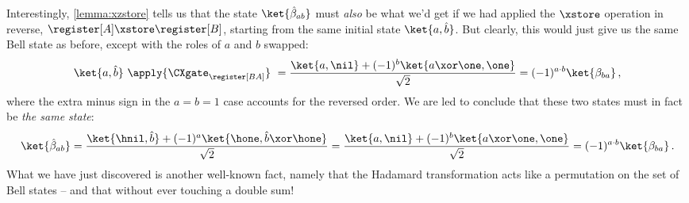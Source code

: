       Interestingly, \cref{lemma:xzstore} tells us that the state
        $\ket{\hat{\beta}_{ab}}$ must \emph{also} be what we'd get if we
        had applied the $\xstore$ operation in reverse, 
        $\register[A] \xstore \register[B]$,
        starting from the same initial state $\ket{a, \hat b}$.
        But clearly, this would just give us
        the same Bell state as before, except with the roles of $a$ and $b$ swapped:
        \[
          \ket{a, \hat b}\ \apply{\CXgate_{\register[BA]}}\
            = \frac{\ket{a, \nil} + (-1)^b \ket{a \xor \one, \one}}{\sqrt 2} =
            (-1)^{a \cdot b}\ket{\beta_{ba}}\, ,
        \]
        where the extra minus sign in the $a = b = 1$ case accounts for the reversed order.
        We are led to conclude that these two states must in fact be \emph{the
        same state}:
        \[
          \ket{\hat{\beta}_{ab}} = \frac{\ket{\hnil, \hat b} + (-1)^a \ket{\hone, \hat b \xor \hone}}{\sqrt 2}
          = \frac{\ket{a, \nil} + (-1)^b \ket{a \xor \one, \one}}{\sqrt 2} =
          (-1)^{a \cdot b}\ket{\beta_{ba}}\, .
        \]
        What we have just discovered is another well-known fact, namely that the Hadamard
          transformation acts like a permutation on the set of Bell states -- and
          that without ever touching a double sum! 

